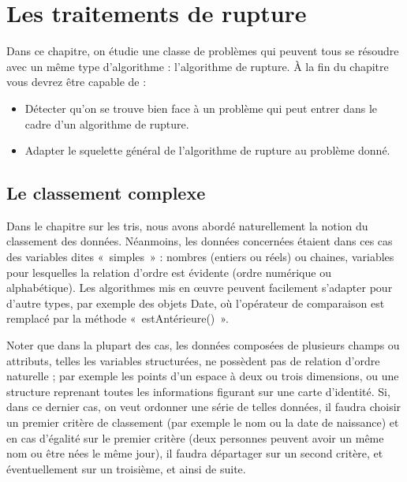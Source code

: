 \chapter{Les traitements de rupture}


Dans ce chapitre, on étudie une classe de problèmes qui peuvent tous se
résoudre avec un même type d'algorithme :
l'algorithme de rupture. À la fin du chapitre vous
devrez être capable de :

\begin{itemize}
	\item 
		Détecter qu'on se trouve bien face à un problème qui
		peut entrer dans le cadre d'un algorithme de rupture.
	\item 
		Adapter le squelette général de l'algorithme de rupture
		au problème donné.
\end{itemize}


\section{Le classement complexe}

Dans le chapitre sur les tris, nous avons abordé naturellement la notion
du classement des données. Néanmoins, les données concernées étaient
dans ces cas des variables dites «~simples~» : nombres (entiers ou
réels) ou chaines, variables pour lesquelles la relation d’ordre est
évidente (ordre numérique ou alphabétique). Les algorithmes mis en
œuvre peuvent facilement s’adapter pour d’autre types, par exemple des
objets Date, où l’opérateur de comparaison est remplacé par la méthode
«~estAntérieure()~».

Noter que dans la plupart des cas, les données composées de plusieurs
champs ou attributs, telles les variables structurées, ne possèdent pas
de relation d’ordre naturelle ; par exemple les points d’un espace à
deux ou trois dimensions, ou une structure reprenant toutes les
informations figurant sur une carte d’identité. Si, dans ce dernier
cas, on veut ordonner une série de telles données, il faudra choisir un
premier critère de classement (par exemple le nom ou la date de
naissance) et en cas d’égalité sur le premier critère (deux personnes
peuvent avoir un même nom ou être nées le même jour), il faudra
départager sur un second critère, et éventuellement sur un troisième,
et ainsi de suite.

